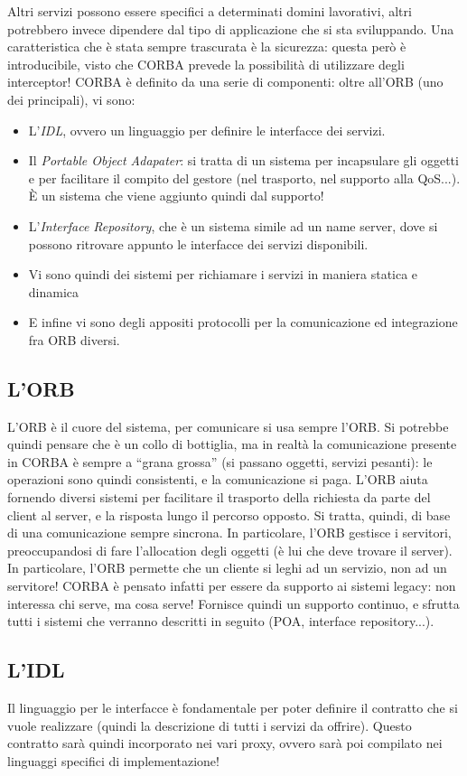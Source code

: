 Altri servizi possono essere specifici a determinati domini lavorativi, altri potrebbero invece dipendere dal tipo di
applicazione che si sta sviluppando.
Una caratteristica che è stata sempre trascurata è la sicurezza: questa però è introducibile, visto che CORBA prevede 
la possibilità di utilizzare degli interceptor!
CORBA è definito da una serie di componenti: oltre all'ORB (uno dei principali), vi sono:
\begin{itemize}
 \item L'\textit{IDL}, ovvero un linguaggio per definire le interfacce dei servizi.
 \item Il \textit{Portable Object Adapater}: si tratta di un sistema per incapsulare gli oggetti e per facilitare il 
compito del  gestore (nel trasporto, nel supporto alla QoS...). È un sistema che viene aggiunto quindi dal supporto!
 \item L'\textit{Interface Repository}, che è un sistema simile ad un name server, dove si possono ritrovare appunto le 
 interfacce dei servizi disponibili.
 \item Vi sono quindi dei sistemi per richiamare i servizi in maniera statica e dinamica
 \item E infine vi sono degli appositi protocolli per la comunicazione ed integrazione fra ORB diversi.
\end{itemize}
\subsection{L'ORB}
L'ORB è il cuore del sistema, per comunicare si usa sempre l'ORB. Si potrebbe quindi pensare che è un collo di 
bottiglia, ma in realtà la comunicazione presente in CORBA è sempre a ``grana grossa'' (si passano oggetti, servizi 
pesanti): le operazioni sono quindi consistenti, e la comunicazione si paga. L'ORB aiuta fornendo diversi sistemi per 
facilitare il trasporto della richiesta da parte del client al server, e la risposta lungo il percorso opposto. Si 
tratta, quindi, di base di una comunicazione sempre sincrona.
In particolare, l'ORB gestisce i servitori, preoccupandosi di fare l'allocation degli oggetti (è lui che deve trovare il 
server). In particolare, l'ORB permette che un cliente si leghi ad un servizio, non ad un servitore! CORBA è pensato
infatti per essere da supporto ai sistemi legacy: non interessa chi serve, ma cosa serve! Fornisce quindi un supporto 
continuo, e sfrutta tutti i sistemi che verranno descritti in seguito (POA, interface repository...).
\subsection{L'IDL}
Il linguaggio per le interfacce è fondamentale per poter definire il contratto che si vuole realizzare (quindi la 
descrizione di tutti i servizi da offrire). Questo contratto sarà quindi incorporato nei vari proxy, ovvero sarà poi 
compilato nei linguaggi specifici di implementazione!

